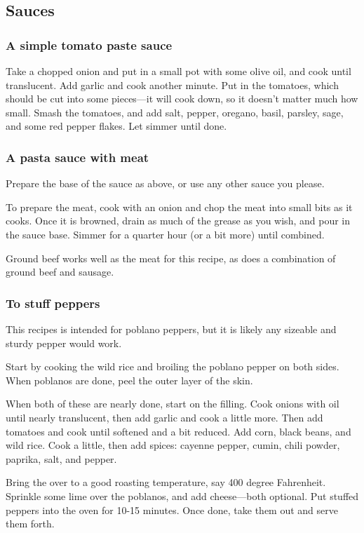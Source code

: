 \documentclass[10pt]{article}
\begin{document}
\subsection*{Sauces}

\subsubsection*{A simple tomato paste sauce}

Take a chopped onion and put in a small pot with some olive oil, and cook until translucent.
Add garlic and cook another minute.
Put in the tomatoes, which should be cut into some pieces---it will cook down, so it doesn't matter much how small.
Smash the tomatoes, and add salt, pepper, oregano, basil, parsley, sage, and some red pepper flakes.
Let simmer until done.

\subsubsection*{A pasta sauce with meat}

Prepare the base of the sauce as above, or use any other sauce you please.

To prepare the meat, cook with an onion and chop the meat into small bits as it cooks.
Once it is browned, drain as much of the grease as you wish, and pour in the sauce base.
Simmer for a quarter hour (or a bit more) until combined.

Ground beef works well as the meat for this recipe, as does a combination of ground beef and sausage.

\subsubsection*{To stuff peppers}

This recipes is intended for poblano peppers, but it is likely any sizeable and sturdy pepper would work.

Start by cooking the wild rice and broiling the poblano pepper on both sides.
When poblanos are done, peel the outer layer of the skin.

When both of these are nearly done, start on the filling.
Cook onions with oil until nearly translucent, then add garlic and cook a little more.
Then add tomatoes and cook until softened and a bit reduced.
Add corn, black beans, and wild rice.
Cook a little, then add spices: cayenne pepper, cumin, chili powder, paprika, salt, and pepper.

Bring the over to a good roasting temperature, say 400 degree Fahrenheit.
Sprinkle some lime over the poblanos, and add cheese---both optional.
Put stuffed peppers into the oven for 10-15 minutes.
Once done, take them out and serve them forth.
\end{document}
